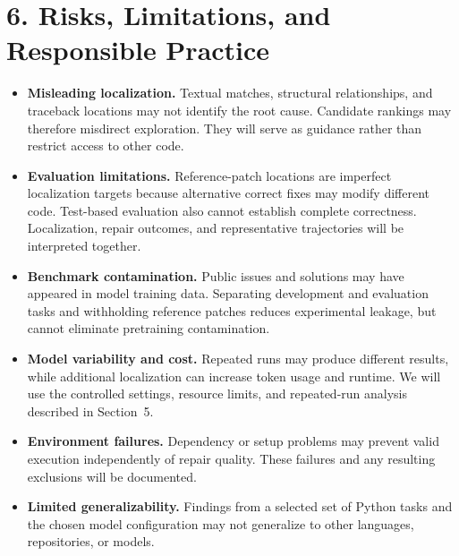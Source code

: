 \documentclass[11pt]{article}
\begin{document}
\section*{6. Risks, Limitations, and Responsible Practice}

\begin{itemize}[leftmargin=*, itemsep=0.4em]

    \item \textbf{Misleading localization.}
    Textual matches, structural relationships, and traceback locations may
    not identify the root cause. Candidate rankings may therefore
    misdirect exploration. They will serve as guidance rather than restrict
    access to other code.

    \item \textbf{Evaluation limitations.}
    Reference-patch locations are imperfect localization targets because
    alternative correct fixes may modify different code. Test-based
    evaluation also cannot establish complete correctness. Localization,
    repair outcomes, and representative trajectories will be interpreted
    together.

    \item \textbf{Benchmark contamination.}
    Public issues and solutions may have appeared in model training data.
    Separating development and evaluation tasks and withholding reference
    patches reduces experimental leakage, but cannot eliminate pretraining
    contamination.

    \item \textbf{Model variability and cost.}
    Repeated runs may produce different results, while additional
    localization can increase token usage and runtime. We will use the
    controlled settings, resource limits, and repeated-run analysis
    described in Section~5.

    \item \textbf{Environment failures.}
    Dependency or setup problems may prevent valid execution independently
    of repair quality. These failures and any resulting exclusions will be
    documented.

    \item \textbf{Limited generalizability.}
    Findings from a selected set of Python tasks and the chosen model
    configuration may not generalize to other languages, repositories, or
    models.

\end{itemize}
\end{document}

